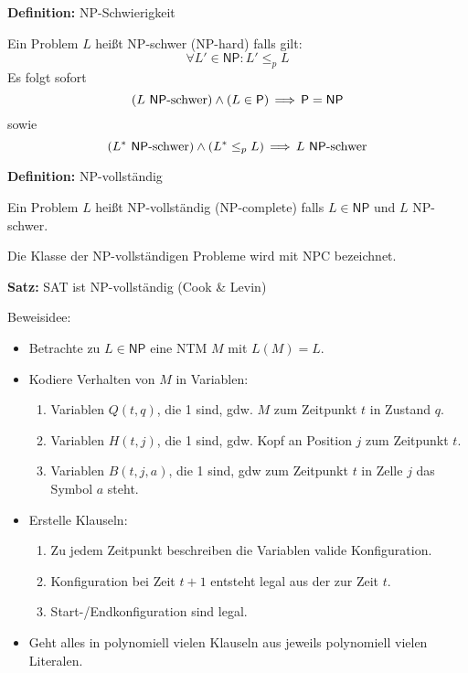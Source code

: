 \documentclass[a4paper,graphics,11pt]{article}
\begin{document}
\textbf{Definition:} \textsf{NP}-Schwierigkeit

Ein Problem $L$ heißt \textsf{NP}-schwer (\textsf{NP}-hard) falls gilt:
$$
    \forall L' \in \textsf{NP} : L' \leq_p L
$$
Es folgt sofort
$$
    (L \text{ \textsf{NP}-schwer}) \land (L \in \textsf{P}) \,\Longrightarrow\, \textsf{P} = \textsf{NP}
$$
sowie
$$
    (L^* \text{ \textsf{NP}-schwer}) \land (L^* \leq_p L) \,\Longrightarrow\, L \text{ \textsf{NP}-schwer}
$$

\strut

\textbf{Definition:} \textsf{NP}-vollständig

Ein Problem $L$ heißt \textsf{NP}-vollständig (\textsf{NP}-complete) falls $L \in \textsf{NP}$ und $L$ 
\textsf{NP}-schwer.

Die Klasse der \textsf{NP}-vollständigen Probleme wird mit \textsf{NPC} bezeichnet.

\strut

\textbf{Satz:} SAT ist \textsf{NP}-vollständig (Cook \& Levin)

Beweisidee:
\begin{itemize}
    \item Betrachte zu $L \in \textsf{NP}$ eine NTM $M$ mit $L(M) = L$.
    \item Kodiere Verhalten von $M$ in Variablen:
        \begin{enumerate}
            \item Variablen $Q(t,q)$, die 1 sind, gdw. $M$ zum Zeitpunkt $t$ in Zustand $q$.
            \item Variablen $H(t,j)$, die 1 sind, gdw. Kopf an Position $j$ zum Zeitpunkt $t$.
            \item Variablen $B(t,j,a)$, die 1 sind, gdw zum Zeitpunkt $t$ in Zelle $j$ das Symbol $a$ steht.
        \end{enumerate}
    \item Erstelle Klauseln:
        \begin{enumerate}
            \item Zu jedem Zeitpunkt beschreiben die Variablen valide Konfiguration.
            \item Konfiguration bei Zeit $t+1$ entsteht legal aus der zur Zeit $t$.
            \item Start-/Endkonfiguration sind legal.
        \end{enumerate}
    \item Geht alles in polynomiell vielen Klauseln aus jeweils polynomiell vielen Literalen.
\end{itemize}
\end{document}
